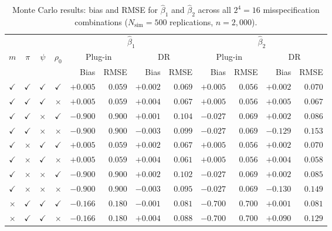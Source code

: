 \begin{table}[htbp]
\centering
\caption{Monte Carlo results: bias and RMSE for $\hat\beta_1$ and $\hat\beta_2$
         across all $2^4 = 16$ misspecification combinations
         ($N_{\mathrm{sim}} = 500$ replications, $n = 2{,}000$).}
\label{tab:sim_results}
\small
\setlength{\tabcolsep}{5pt}
\begin{tabular}{cccc  rr  rr  rr  rr}
\toprule
& & & & \multicolumn{4}{c}{$\hat\beta_1$} & \multicolumn{4}{c}{$\hat\beta_2$} \\
\cmidrule(lr){5-8} \cmidrule(lr){9-12}
$m$ & $\pi$ & $\psi$ & $\rho_0$ & \multicolumn{2}{c}{Plug-in} & \multicolumn{2}{c}{DR} & \multicolumn{2}{c}{Plug-in} & \multicolumn{2}{c}{DR} \\
\cmidrule(lr){5-6}\cmidrule(lr){7-8}\cmidrule(lr){9-10}\cmidrule(lr){11-12}
& & & & Bias & RMSE & Bias & RMSE & Bias & RMSE & Bias & RMSE \\
\midrule
$\checkmark$ & $\checkmark$ & $\checkmark$ & $\checkmark$ & $+0.005$ & $0.059$ & $+0.002$ & $0.069$ & $+0.005$ & $0.056$ & $+0.002$ & $0.070$ \\
$\checkmark$ & $\checkmark$ & $\checkmark$ & $\times$ & $+0.005$ & $0.059$ & $+0.004$ & $0.067$ & $+0.005$ & $0.056$ & $+0.005$ & $0.067$ \\
$\checkmark$ & $\checkmark$ & $\times$ & $\checkmark$ & $-0.900$ & $0.900$ & $+0.001$ & $0.104$ & $-0.027$ & $0.069$ & $+0.002$ & $0.086$ \\
$\checkmark$ & $\checkmark$ & $\times$ & $\times$ & $-0.900$ & $0.900$ & $-0.003$ & $0.099$ & $-0.027$ & $0.069$ & $-0.129$ & $0.153$ \\
$\checkmark$ & $\times$ & $\checkmark$ & $\checkmark$ & $+0.005$ & $0.059$ & $+0.002$ & $0.067$ & $+0.005$ & $0.056$ & $+0.002$ & $0.070$ \\
$\checkmark$ & $\times$ & $\checkmark$ & $\times$ & $+0.005$ & $0.059$ & $+0.004$ & $0.061$ & $+0.005$ & $0.056$ & $+0.004$ & $0.058$ \\
$\checkmark$ & $\times$ & $\times$ & $\checkmark$ & $-0.900$ & $0.900$ & $+0.002$ & $0.102$ & $-0.027$ & $0.069$ & $+0.002$ & $0.085$ \\
$\checkmark$ & $\times$ & $\times$ & $\times$ & $-0.900$ & $0.900$ & $-0.003$ & $0.095$ & $-0.027$ & $0.069$ & $-0.130$ & $0.149$ \\
\midrule
$\times$ & $\checkmark$ & $\checkmark$ & $\checkmark$ & $-0.166$ & $0.180$ & $-0.001$ & $0.081$ & $-0.700$ & $0.700$ & $+0.001$ & $0.081$ \\
$\times$ & $\checkmark$ & $\checkmark$ & $\times$ & $-0.166$ & $0.180$ & $+0.004$ & $0.088$ & $-0.700$ & $0.700$ & $+0.090$ & $0.129$ \\

\end{tabular}
\end{table}
